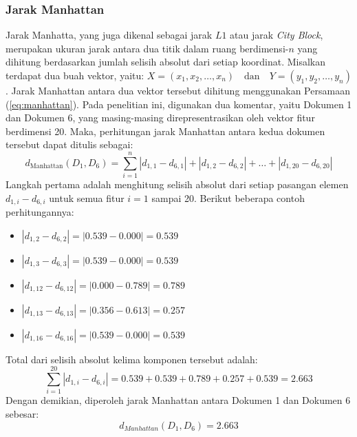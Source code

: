 \documentclass[a4paper,12pt]{report}
\numberwithin{equation}{chapter}
\begin{document}
\subsubsection{Jarak Manhattan}
Jarak Manhatta, yang juga dikenal sebagai jarak $L1$ atau jarak \textit{City Block}, merupakan ukuran jarak antara dua titik dalam ruang berdimensi-$n$ yang dihitung berdasarkan jumlah selisih absolut dari setiap koordinat. Misalkan terdapat dua buah vektor, yaitu: $
X = (x_1, x_2, \ldots, x_n) \quad \text{dan} \quad Y = (y_1, y_2, \ldots, y_n)$. Jarak Manhattan antara dua vektor tersebut dihitung menggunakan Persamaan (\ref{eq:manhattan}). Pada penelitian ini, digunakan dua komentar, yaitu Dokumen 1 dan Dokumen 6, yang masing-masing direpresentrasikan oleh vektor fitur berdimensi 20. Maka, perhitungan jarak Manhattan antara kedua dokumen tersebut dapat ditulis sebagai:
\[
d_{\text{Manhattan}}(D_1, D_6) = \sum_{i=1}^{n} |d_{1,1} - d_{6,1}| + |d_{1,2} - d_{6,2}| + \ldots + |d_{1,20} - d_{6,20}|
\]
Langkah pertama adalah menghitung selisih absolut dari setiap pasangan elemen $d_{1,i} - d_{6,i}$ untuk semua fitur $i = 1$ sampai 20. Berikut beberapa contoh perhitungannya:
\begin{itemize}
    \item $|d_{1,2} - d_{6,2}| = |0.539 - 0.000| = 0.539$
    \item $|d_{1,3} - d_{6,3}| = |0.539 - 0.000| = 0.539$
    \item $|d_{1,12} - d_{6,12}| = |0.000 - 0.789| = 0.789$
    \item $|d_{1,13} - d_{6,13}| = |0.356 - 0.613| = 0.257$
    \item $|d_{1,16} - d_{6,16}| = |0.539 - 0.000| = 0.539$
\end{itemize}
Total dari selisih absolut kelima komponen tersebut adalah:
\[ \sum_{i=1}^{20} |d_{1,i} - d_{6,i}| = 0.539 + 0.539 + 0.789 + 0.257 + 0.539 = 2.663
\]
Dengan demikian, diperoleh jarak Manhattan antara Dokumen 1 dan Dokumen 6 sebesar:
\[ d_{Manhattan}(D_1,D_6) = 2.663
\]
\end{document}
